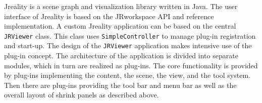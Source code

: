\documentclass[Thesis.tex]{subfiles}
\begin{document}
{\sc Jreality} \cite{JrealityWebsite} is a scene graph and visualization library written in {\sc Java}.
The user interface of {\sc Jreality} is based on the {\sc JRworkspace} API and reference
implementation.
A custom {\sc Jreality} application can be based on the central {\tt JRViewer} class. 
This class uses {\tt SimpleController} to manage
plug-in registration and start-up. 
The design of the {\tt JRViewer} application makes intensive use of the plug-in concept.
The architecture of the application is divided into separate modules, which in turn are realized as plug-ins.
The core functionality is provided by plug-ins implementing the content, the scene, the view, and the tool system.
Then there are plug-ins providing the tool bar and menu bar as well as the overall layout of shrink panels as described above.


\subfilebibliography
\end{document}
